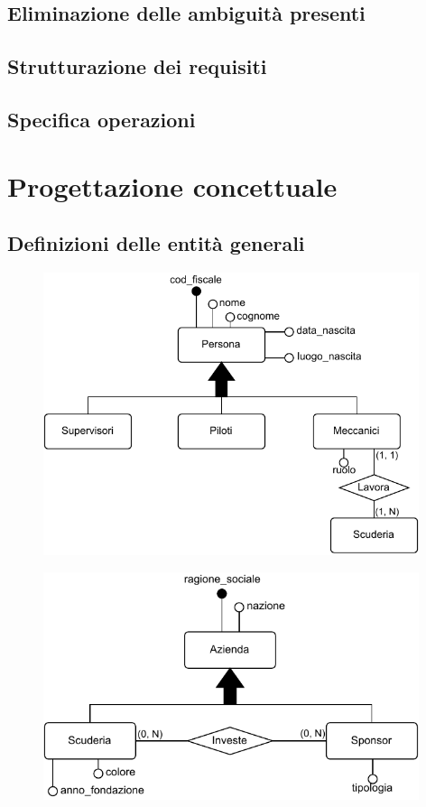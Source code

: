 \documentclass[11pt]{article}
\begin{document}
\subsection{Eliminazione delle ambiguità presenti}
\subsection{Strutturazione dei requisiti}
\subsection{Specifica operazioni}

\section{Progettazione concettuale}

\subsection{Definizioni delle entità generali}
\begin{figure}[H]
    \centering
    \includegraphics[width=11cm]{../er/gare_persone.pdf}
\end{figure}

\begin{figure}[H]
    \centering
    \includegraphics[width=11cm]{../er/gare_aziende.pdf}
\end{figure}
\end{document}
